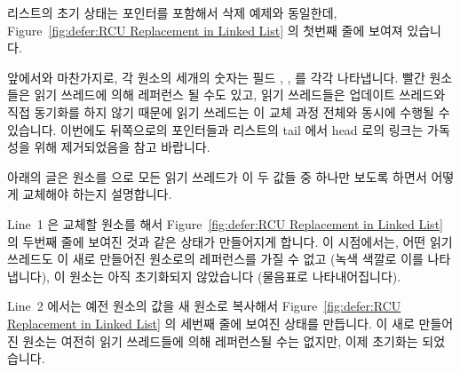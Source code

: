 리스트의 초기 상태는  포인터를 포함해서 삭제 예제와 동일한데,
Figure~\ref{fig:defer:RCU Replacement in Linked List} 의 첫번째 줄에 보여져
있습니다.

앞에서와 마찬가지로, 각 원소의 세개의 숫자는 필드 , ,  를
각각 나타냅니다.
빨간 원소들은 읽기 쓰레드에 의해 레퍼런스 될 수도 있고, 읽기 쓰레드들은
업데이트 쓰레드와 직접 동기화를 하지 않기 때문에 읽기 쓰레드는 이 교체 과정
전체와 동시에 수행될 수 있습니다.
이번에도 뒤쪽으로의 포인터들과 리스트의 tail 에서 head 로의 링크는 가독성을
위해 제거되었음을 참고 바랍니다.

아래의 글은  원소를  으로 모든 읽기 쓰레드가 이 두 값들 중
하나만 보도록 하면서 어떻게 교체해야 하는지 설명합니다.

Line~1 은 교체할 원소를  해서
Figure~\ref{fig:defer:RCU Replacement in Linked List} 의 두번째 줄에 보여진
것과 같은 상태가 만들어지게 합니다.
이 시점에서는, 어떤 읽기 쓰레드도 이 새로 만들어진 원소로의 레퍼런스를 가질 수
없고 (녹색 색깔로 이를 나타냅니다), 이 원소는 아직 초기화되지 않았습니다
(물음표로 나타내어집니다).

Line~2 에서는 예전 원소의 값을 새 원소로 복사해서
Figure~\ref{fig:defer:RCU Replacement in Linked List} 의 세번째 줄에 보여진
상태를 만듭니다.
이 새로 만들어진 원소는 여전히 읽기 쓰레드들에 의해 레퍼런스될 수는 없지만,
이제 초기화는 되었습니다.

